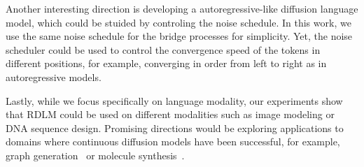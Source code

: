 Another interesting direction is developing a autoregressive-like diffusion language model, which could be stuided by controling the noise schedule.
In this work, we use the same noise schedule for the bridge processes for simplicity. 
Yet, the noise scheduler could be used to control the convergence speed of the tokens in different positions, for example, converging in order from left to right as in autoregressive models.

Lastly, while we focus specifically on language modality, our experiments show that RDLM could be used on different modalities such as image modeling or DNA sequence design. 
Promising directions would be exploring applications to domains where continuous diffusion models have been successful, for example, graph generation~\citep{jo2024graph} or molecule synthesis~\citep{jung2024mol}.












